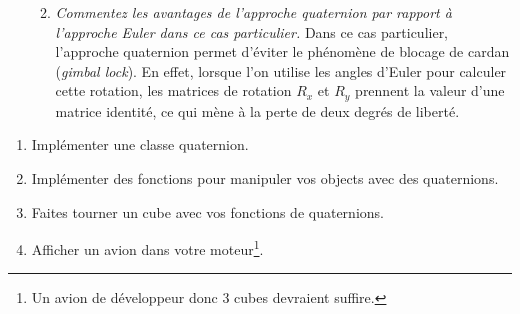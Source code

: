 \documentclass[a4paper,12pt]{article}
\begin{document}
\begin{enumerate}
\begin{enumerate}
\begin{equation}
              \end{equation}
              \item \emph{Commentez les avantages de l’approche quaternion par rapport à l’approche Euler dans ce cas particulier.} \newline \newline
              Dans ce cas particulier, l'approche quaternion permet d'éviter le phénomène de blocage de cardan (\emph{gimbal lock}). En effet, lorsque l'on utilise les angles d'Euler pour calculer cette rotation, les matrices de rotation $R_x$ et $R_y$ prennent la valeur d'une matrice identité, ce qui mène à la perte de deux degrés de liberté.
          \end{enumerate}
\end{enumerate}


\begin{enumerate}
    \item Implémenter une classe quaternion.
    \item Implémenter des fonctions pour manipuler vos objects avec des quaternions.
    \item Faites tourner un cube avec vos fonctions de quaternions.
    \item Afficher un avion dans votre moteur\footnote{Un avion de développeur donc 3 cubes devraient suffire.}.
\end{enumerate}
\end{document}
